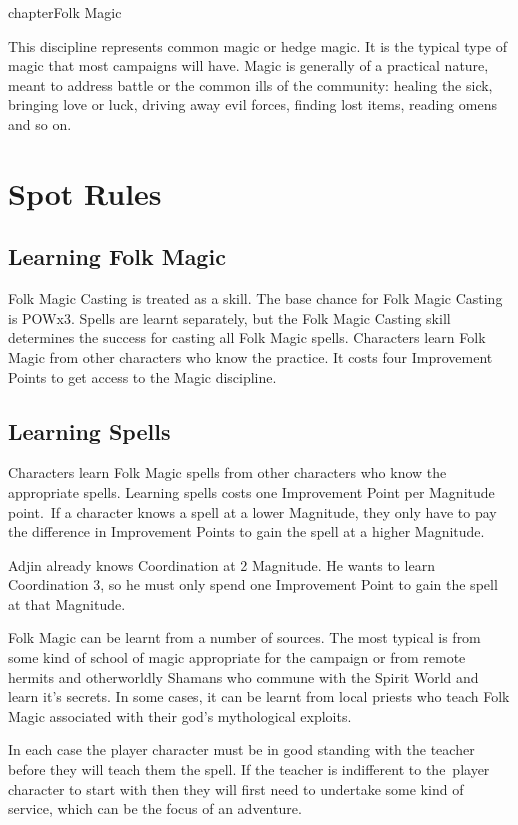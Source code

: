 chapter{Folk Magic}
\label{ch:magic}

This discipline represents common magic or hedge magic. It is the typical type of magic that most campaigns will have. Magic is generally of a practical nature, meant to address battle or the common ills of the community: healing the sick, bringing love or luck, driving away evil forces, finding lost items, reading omens and so on. 


\section{Spot Rules}

\subsection{Learning Folk Magic}
Folk Magic Casting is treated as a skill. The base chance for Folk Magic Casting is POWx3. Spells are learnt separately, but the Folk Magic Casting skill determines the success for casting all Folk Magic spells. Characters learn Folk Magic from other characters who know the practice. It costs four Improvement Points to get access to the Magic discipline.

\subsection{Learning Spells}
Characters learn Folk Magic spells from other characters who know the appropriate spells. Learning spells costs one Improvement Point per Magnitude point. If a character knows a spell at a lower Magnitude, they only have to pay the difference in Improvement Points to gain the spell at a higher Magnitude.

\begin{rpg-examplebox}
Adjin already knows Coordination at 2 Magnitude. He wants to learn Coordination 3, so he must only spend one Improvement Point to gain the spell at that Magnitude.
\end{rpg-examplebox}


Folk Magic can be learnt from a number of sources. The most typical is from some kind of school of magic appropriate for the campaign or from remote hermits and otherworldly Shamans who commune with the Spirit World and learn it's secrets. In some cases, it can be learnt from local priests who teach Folk Magic associated with their god's mythological exploits.

In each case the player character must be in good standing with the teacher before they will teach them the spell. If the teacher is indifferent to the player character to start with then they will first need to undertake some kind of service, which can be the focus of an adventure.

